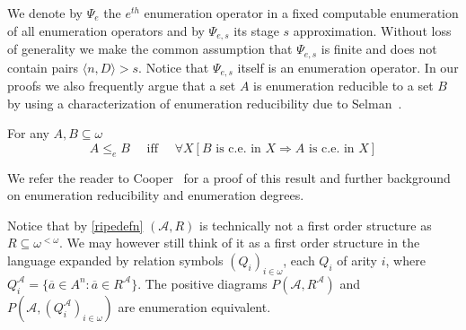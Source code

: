 \documentclass[11pt]{amsart}
\newcommand{\A}{{\mathcal{A}}}
\renewcommand{\bar}[1]{\overline{#1}}
\begin{document}
We denote by $\Psi_e$ the $e^{th}$ enumeration operator in a fixed computable enumeration of all enumeration operators and by $\Psi_{e,s}$ its stage $s$ approximation. Without loss of generality we make the common assumption that $\Psi_{e,s}$ is finite and does not contain pairs $\langle n,D\rangle>s$. Notice that $\Psi_{e,s}$ itself is an enumeration operator.
In our proofs we also frequently argue that a set $A$ is enumeration reducible to a set $B$ by using a characterization of enumeration reducibility due to Selman~\cite{selman1971a}. 
\begin{thm}
    For any $A, B \subseteq \omega$
    \begin{equation*}
        A \leq_e B \quad \text{ iff } \quad \forall X[B \text{ is c.e. in } X \Rightarrow A \text{ is c.e. in } X]
    \end{equation*}
\end{thm}
We refer the reader to Cooper~\cite{cooper2003} for a proof of this result and further background on enumeration reducibility and enumeration degrees.

Notice that by \cref{ripedefn} $(\A,R)$ is technically not a first order structure as $R\subseteq \omega^{<\omega}$. We may however still think of it as a first order structure in the language expanded by relation symbols $(Q_i)_{i\in\omega}$, each $Q_i$ of arity $i$, where
$Q_i^\A=\{ \bar a \in A^{n}: \bar a\in R^\A\}$. The positive diagrams $P(\A,R^\A)$ and $P(\A,(Q_i^\A)_{i\in\omega})$ are enumeration equivalent.
\end{document}
